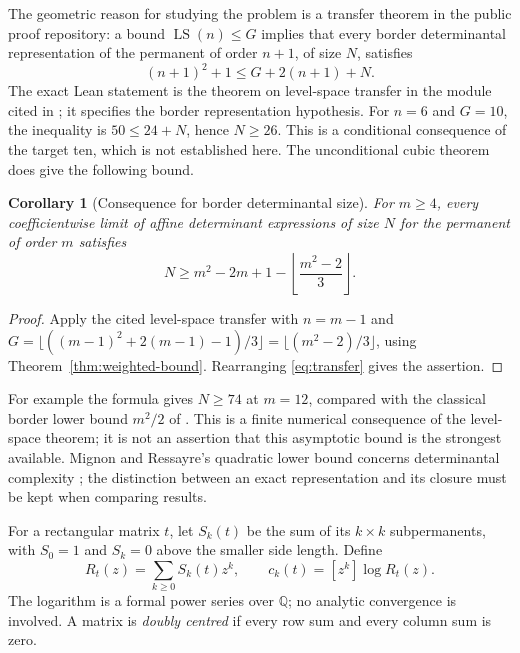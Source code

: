 \documentclass[11pt]{article}
\newcommand{\Q}{\mathbb Q}
\newcommand{\LS}{\operatorname{LS}}
\newtheorem{corollary}[theorem]{Corollary}
\theoremstyle{definition}
\theoremstyle{remark}
\begin{document}
The geometric reason for studying the problem is a transfer theorem in the public proof repository: a bound $\LS(n)\leq G$ implies that every border determinantal representation of the permanent of order $n+1$, of size $N$, satisfies
\begin{equation}\label{eq:transfer}
 (n+1)^2+1\leq G+2(n+1)+N.
\end{equation}
The exact Lean statement is the theorem on level-space transfer in the module cited in \citet{FleetTransfer}; it specifies the border representation hypothesis.
For $n=6$ and $G=10$, the inequality is $50\leq24+N$, hence $N\geq26$.
This is a conditional consequence of the target ten, which is not established here. The unconditional cubic theorem does give the following bound.

\begin{corollary}[Consequence for border determinantal size]\label{cor:border-cubic-bound}
For $m\ge4$, every coefficientwise limit of affine determinant expressions of size $N$ for the permanent of order $m$ satisfies
\[
 N\ge m^2-2m+1-\left\lfloor\frac{m^2-2}{3}\right\rfloor.
\]
\end{corollary}
\begin{proof}
Apply the cited level-space transfer with $n=m-1$ and
$G=\lfloor((m-1)^2+2(m-1)-1)/3\rfloor=\lfloor(m^2-2)/3\rfloor$, using Theorem~\ref{thm:weighted-bound}. Rearranging \eqref{eq:transfer} gives the assertion.
\end{proof}
For example the formula gives $N\ge74$ at $m=12$, compared with the classical border lower bound $m^2/2$ of \citet[Theorem~1.0.1, p.~1 of the April~2010 author manuscript]{LMR}. This is a finite numerical consequence of the level-space theorem; it is not an assertion that this asymptotic bound is the strongest available.
Mignon and Ressayre's quadratic lower bound concerns determinantal complexity \citep[Theorem~1]{MR}; the distinction between an exact representation and its closure must be kept when comparing results.

For a rectangular matrix $t$, let $S_k(t)$ be the sum of its $k\times k$ subpermanents, with $S_0=1$ and $S_k=0$ above the smaller side length. Define
\[
 R_t(z)=\sum_{k\geq0}S_k(t)z^k,
 \qquad c_k(t)=[z^k]\log R_t(z).
\]
The logarithm is a formal power series over $\Q$; no analytic convergence is involved. A matrix is \emph{doubly centred} if every row sum and every column sum is zero.
\end{document}

